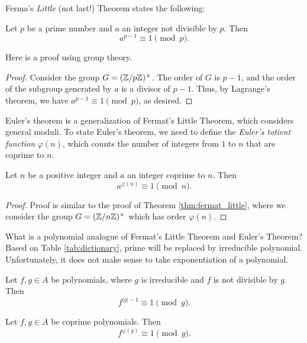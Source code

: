 Ferma's \emph{Little} (not last!) Theorem states the following:
\begin{theorem}
    \label{thm:fermat_little}
    Let $p$ be a prime number and $a$ an integer not divisible by $p$.
    Then
    \[
        a^{p - 1} \equiv 1 \pmod{p}.
    \]
\end{theorem}

Here is a proof using group theory.

\begin{proof}
    Consider the group $G = (\mathbb{Z} / p\mathbb{Z})^\times$.
    The order of $G$ is $p - 1$, and the order of the subgroup generated by $a$ is a divisor of $p - 1$.
    Thus, by Lagrange's theorem, we have $a^{p - 1} \equiv 1 \pmod{p}$, as desired.
\end{proof}

Euler's theorem is a generalization of Fermat's Little Theorem, which considers general moduli.
To state Euler's theorem, we need to define the \emph{Euler's totient function} $\varphi(n)$, which counts the number of integers from $1$ to $n$ that are coprime to $n$.

\begin{theorem}
    \label{thm:euler}
    Let $n$ be a positive integer and $a$ an integer coprime to $n$.
    Then
    \[
        a^{\varphi(n)} \equiv 1 \pmod{n}.
    \]
\end{theorem}
\begin{proof}
    Proof is similar to the proof of Theorem \ref{thm:fermat_little}, where we consider the group $G = (\mathbb{Z} / n\mathbb{Z})^\times$ which has order $\varphi(n)$.
\end{proof}

What is a polynomial analogue of Fermat's Little Theorem and Euler's Theorem?
Based on Table \ref{tab:dictionary}, prime will be replaced by irreducible polynomial.
Unfortunately, it does not make sense to take exponentiation of a polynomial.


\begin{theorem}
    \label{thm:polynomial_fermat_little}
    Let $f, g \in A$ be polynomials, where $g$ is irreducible and $f$ is not divisible by $g$.
    Then
    \[
        f^{|g| - 1} \equiv 1 \pmod{g}.
    \]
\end{theorem}


\begin{theorem}
    \label{thm:polynomial_euler}
    Let $f, g \in A$ be coprime polynomials.
    Then
    \[
        f^{\varphi(g)} \equiv 1 \pmod{g}.
    \]
\end{theorem}

